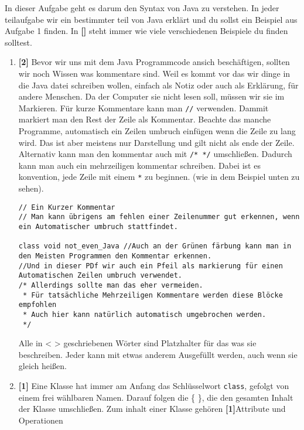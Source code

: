 
In dieser Aufgabe geht es darum den Syntax von Java zu verstehen.
In jeder teilaufgabe wir ein bestimmter teil von Java erklärt und du sollst ein Beispiel aus Aufgabe 1 finden. In \textbf{[]} steht immer wie viele verschiedenen Beispiele du finden solltest.

\begin{enumerate}
    \item \textbf{[2]} Bevor wir uns mit dem Java Programmcode ansich beschäftigen, sollten wir noch Wissen was kommentare sind.
    Weil es kommt vor das wir dinge in die Java datei schreiben wollen, einfach als Notiz oder auch als Erklärung, für andere Menschen. Da der Computer sie nicht lesen soll, müssen wir sie im Markieren.
          Für kurze Kommentare kann man \lstinline[breaklines=false]{//} verwenden. Dammit markiert man den Rest der Zeile als Kommentar. Beachte das manche Programme, automatisch ein Zeilen umbruch einfügen wenn die Zeile zu lang wird.
          Das ist aber meistens nur Darstellung und gilt nicht als ende der Zeile.
          Alternativ kann man den kommentar auch mit \lstinline[breaklines=false]{/* */} umschließen. Dadurch kann man auch ein mehrzeiligen kommentar schreiben. Dabei ist es konvention, jede Zeile mit einem \textcolor{javagreen}{\texttt{*}} zu beginnen. (wie in dem Beispiel unten zu sehen).
          \begin{lstlisting}[title=\textbf{Kommentar Beispiel}]
// Ein Kurzer Kommentar 
// Man kann übrigens am fehlen einer Zeilenummer gut erkennen, wenn ein Automatischer umbruch stattfindet.
    
class void not_even_Java //Auch an der Grünen färbung kann man in den Meisten Programmen den Kommentar erkennen.
//Und in dieser PDf wir auch ein Pfeil als markierung für einen Automatischen Zeilen umbruch verwendet.
/* Allerdings sollte man das eher vermeiden.
 * Für tatsächliche Mehrzeiligen Kommentare werden diese Blöcke empfohlen
 * Auch hier kann natürlich automatisch umgebrochen werden.
 */
        \end{lstlisting}
        Alle in < > geschriebenen Wörter sind Platzhalter für das was sie beschreiben. Jeder kann mit etwas anderem Ausgefüllt werden, auch wenn sie gleich heißen.
    \item \textbf{[1]} Eine Klasse hat immer am Anfang das Schlüsselwort \lstinline{class}, gefolgt von einem frei wählbaren Namen. Darauf folgen die \{ \}, die den gesamten Inhalt der Klasse umschließen.
          Zum inhalt einer Klasse gehören \textbf{[1]}Attribute und Operationen


\end{enumerate}
